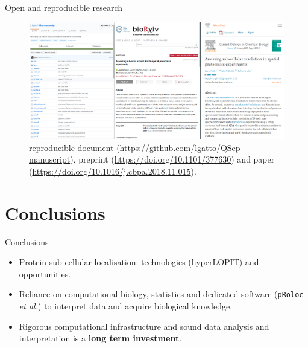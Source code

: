 \documentclass{beamer}
\theoremstyle{example}
\begin{document}
\begin{frame}{Open and reproducible research}
  \centering
  \begin{figure}
    \includegraphics[width=1\linewidth]{./figs/qsep_screen.png}
    \caption{\cite{Gatto:2018} reproducible document
      (\url{https://github.com/lgatto/QSep-manuscript}), preprint
      (\url{https://doi.org/10.1101/377630}) and paper
      (\url{https://doi.org/10.1016/j.cbpa.2018.11.015}).}
  \end{figure}
\end{frame}


\section{Conclusions}


\begin{frame}[fragile]{Conclusions}
  \begin{itemize}
  \item Protein sub-cellular localisation: technologies (hyperLOPIT)
    and opportunities.

  \item Reliance on computational biology, statistics and dedicated
    software (\texttt{pRoloc} \textit{et al.}) to interpret data and
    acquire biological knowledge.

  \item Rigorous computational infrastructure and sound data analysis
    and interpretation is a \textbf{long term investment}.

  \end{itemize}

\end{frame}



\end{document}
